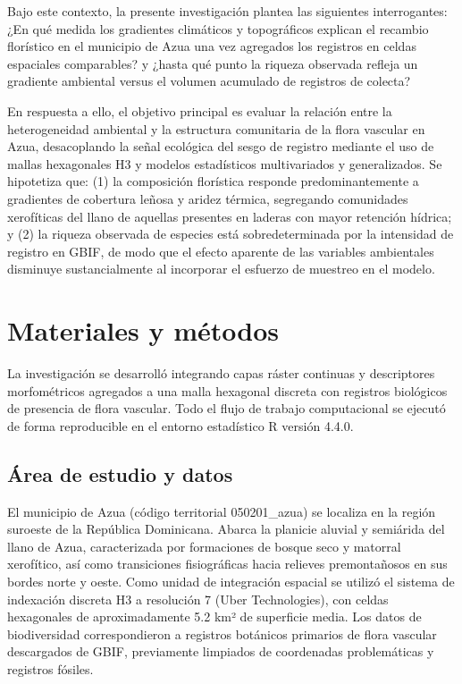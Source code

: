 \documentclass[
  12pt,
  man,
  floatsintext]{apa7}
\begin{document}
Bajo este contexto, la presente investigación plantea las siguientes interrogantes: ¿En qué medida los gradientes climáticos y topográficos explican el recambio florístico en el municipio de Azua una vez agregados los registros en celdas espaciales comparables? y ¿hasta qué punto la riqueza observada refleja un gradiente ambiental versus el volumen acumulado de registros de colecta?

En respuesta a ello, el objetivo principal es evaluar la relación entre la heterogeneidad ambiental y la estructura comunitaria de la flora vascular en Azua, desacoplando la señal ecológica del sesgo de registro mediante el uso de mallas hexagonales H3 y modelos estadísticos multivariados y generalizados. Se hipotetiza que: (1) la composición florística responde predominantemente a gradientes de cobertura leñosa y aridez térmica, segregando comunidades xerofíticas del llano de aquellas presentes en laderas con mayor retención hídrica; y (2) la riqueza observada de especies está sobredeterminada por la intensidad de registro en GBIF, de modo que el efecto aparente de las variables ambientales disminuye sustancialmente al incorporar el esfuerzo de muestreo en el modelo.

\section{Materiales y métodos}\label{materiales-y-muxe9todos}

La investigación se desarrolló integrando capas ráster continuas y descriptores morfométricos agregados a una malla hexagonal discreta con registros biológicos de presencia de flora vascular. Todo el flujo de trabajo computacional se ejecutó de forma reproducible en el entorno estadístico R versión 4.4.0.

\subsection{Área de estudio y datos}\label{uxe1rea-de-estudio-y-datos}

El municipio de Azua (código territorial 050201\_azua) se localiza en la región suroeste de la República Dominicana. Abarca la planicie aluvial y semiárida del llano de Azua, caracterizada por formaciones de bosque seco y matorral xerofítico, así como transiciones fisiográficas hacia relieves premontañosos en sus bordes norte y oeste. Como unidad de integración espacial se utilizó el sistema de indexación discreta H3 a resolución 7 (Uber Technologies), con celdas hexagonales de aproximadamente 5.2 km² de superficie media. Los datos de biodiversidad correspondieron a registros botánicos primarios de flora vascular descargados de GBIF, previamente limpiados de coordenadas problemáticas y registros fósiles.
\end{document}
